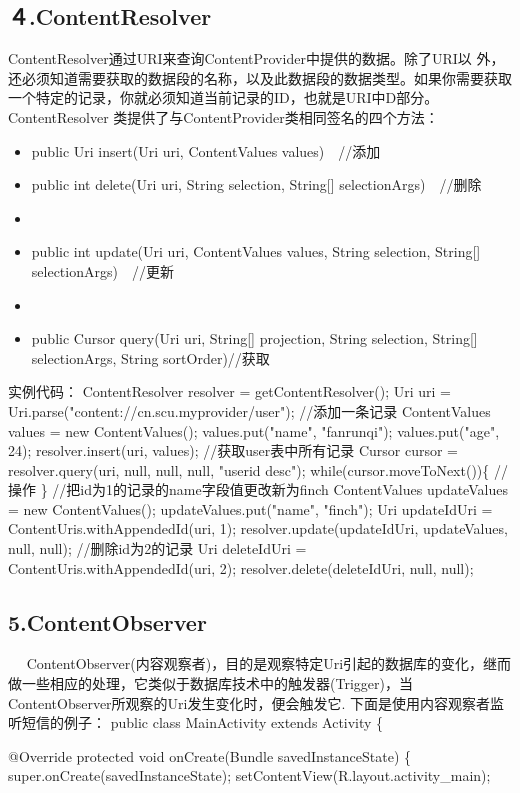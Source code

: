 \documentclass[9pt, b5paper]{article}
\begin{document}
\subsection{４.ContentResolver}
\label{sec-14-4}
ContentResolver通过URI来查询ContentProvider中提供的数据。除了URI以 外，还必须知道需要获取的数据段的名称，以及此数据段的数据类型。如果你需要获取一个特定的记录，你就必须知道当前记录的ID，也就是URI中D部分。
ContentResolver 类提供了与ContentProvider类相同签名的四个方法：
\begin{itemize}
\item public Uri insert(Uri uri, ContentValues values)　//添加
\item public int delete(Uri uri, String selection, String[] selectionArgs)　//删除
\item 
\item public int update(Uri uri, ContentValues values, String selection, String[] selectionArgs)　//更新
\item 
\item public Cursor query(Uri uri, String[] projection, String selection, String[] selectionArgs, String sortOrder)//获取
\end{itemize}
实例代码：
ContentResolver resolver =  getContentResolver();
Uri uri = Uri.parse("content://cn.scu.myprovider/user");
//添加一条记录
ContentValues values = new ContentValues();
values.put("name", "fanrunqi");
values.put("age", 24);
resolver.insert(uri, values);  
//获取user表中所有记录
Cursor cursor = resolver.query(uri, null, null, null, "userid desc");
while(cursor.moveToNext())\{
   //操作
\}
//把id为1的记录的name字段值更改新为finch
ContentValues updateValues = new ContentValues();
updateValues.put("name", "finch");
Uri updateIdUri = ContentUris.withAppendedId(uri, 1);
resolver.update(updateIdUri, updateValues, null, null);
//删除id为2的记录
Uri deleteIdUri = ContentUris.withAppendedId(uri, 2);
resolver.delete(deleteIdUri, null, null);
\subsection{5.ContentObserver}
\label{sec-14-5}
　 ContentObserver(内容观察者)，目的是观察特定Uri引起的数据库的变化，继而做一些相应的处理，它类似于数据库技术中的触发器(Trigger)，当ContentObserver所观察的Uri发生变化时，便会触发它.
    下面是使用内容观察者监听短信的例子：
public class MainActivity extends Activity \{

@Override
protected void onCreate(Bundle savedInstanceState) \{
    super.onCreate(savedInstanceState);
    setContentView(R.layout.activity\_main);
\end{document}
